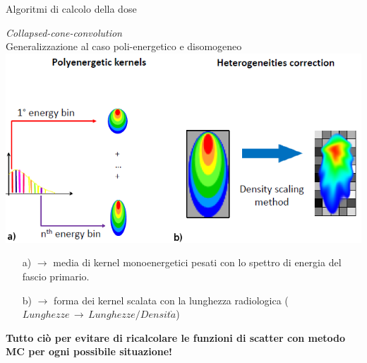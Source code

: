 \documentclass{beamer}
\begin{document}
\begin{frame}[t]{Algoritmi di calcolo della dose}
\small
{\centering
\alert{\textit{Collapsed-cone-convolution}\\
\footnotesize Generalizzazione al caso poli-energetico e disomogeneo} \\ \vspace{.5cm}
\includegraphics[width=.7\textwidth]{../cap1/kern_trans.png}\\
\scriptsize
\begin{itemize}
\item[a)]  $\rightarrow$ media di kernel monoenergetici pesati con lo spettro di energia del fascio primario.
\item[b)]  $\rightarrow$ forma dei kernel scalata con la lunghezza radiologica ($Lunghezze\,\rightarrow\,Lunghezze / Densit\grave{a}$)
\end{itemize}
}
\color{Dgreen} \scriptsize \bf Tutto ciò per evitare di ricalcolare le funzioni di scatter con metodo MC per ogni possibile situazione!
\end{frame}
\end{document}
